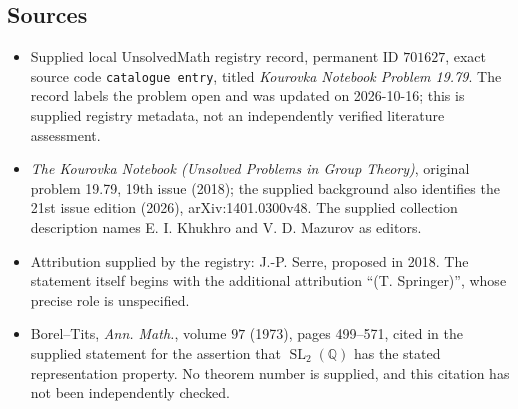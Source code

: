 \documentclass[11pt]{article}
\newcommand{\Q}{\mathbb{Q}}
\begin{document}
\subsection{Sources}
\begin{itemize}
\item Supplied local UnsolvedMath registry record, permanent ID \(701627\), exact source code \texttt{catalogue entry}, titled \emph{Kourovka Notebook Problem 19.79}. The record labels the problem open and was updated on 2026-10-16; this is supplied registry metadata, not an independently verified literature assessment.
\item \emph{The Kourovka Notebook (Unsolved Problems in Group Theory)}, original problem 19.79, 19th issue (2018); the supplied background also identifies the 21st issue edition (2026), arXiv:1401.0300v48. The supplied collection description names E. I. Khukhro and V. D. Mazurov as editors.
\item Attribution supplied by the registry: J.-P. Serre, proposed in 2018. The statement itself begins with the additional attribution ``(T. Springer)'', whose precise role is unspecified.
\item Borel--Tits, \emph{Ann. Math.}, volume \(97\) (1973), pages 499--571, cited in the supplied statement for the assertion that \(\operatorname{SL}_2(\Q)\) has the stated representation property. No theorem number is supplied, and this citation has not been independently checked.
\end{itemize}
\end{document}
